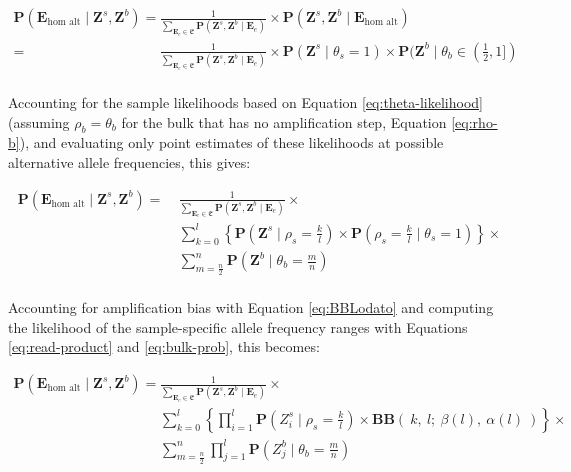 \documentclass[12pt,inline]{wlscirep}
\newcommand{\Prob}{{\mathbf{P}}}
\newcommand{\cB}{{\mathbf{B}}}
\begin{document}
\begin{equation}
 \label{eq:hom-alt-posterior-samples}
 \begin{split}
  \Prob(\boldsymbol{E}_{\text{hom alt}} \mid \boldsymbol{Z}^s,\boldsymbol{Z}^b)
    =~&\frac{1}{\sum_{\boldsymbol{E}_e \in \mathfrak{E}}{\Prob(\boldsymbol{Z}^s,\boldsymbol{Z}^b \mid \boldsymbol{E}_e )}} \times
      \Prob(\boldsymbol{Z}^s,\boldsymbol{Z}^b \mid \boldsymbol{E}_{\text{hom alt}}) \\
    =~&\frac{1}{\sum_{\boldsymbol{E}_e \in \mathfrak{E}}{\Prob(\boldsymbol{Z}^s,\boldsymbol{Z}^b \mid \boldsymbol{E}_e )}} \times
      \Prob(\boldsymbol{Z}^s \mid \theta_s = 1) \times \Prob(\boldsymbol{Z}^b \mid \theta_b \in (\frac12,1])\\
  \end{split}    
\end{equation}

Accounting for the sample likelihoods based on Equation \ref{eq:theta-likelihood} (assuming $\rho_b = \theta_b$ for the bulk that has no amplification step, Equation \ref{eq:rho-b}), and evaluating only point estimates of these likelihoods at possible alternative allele frequencies, this gives:

\begin{equation}
 \label{eq:hom-alt-posterior-likelihoods}
 \begin{split}   
 \Prob(\boldsymbol{E}_{\text{hom alt}} \mid \boldsymbol{Z}^s,\boldsymbol{Z}^b)
   =~&\frac{1}{\sum_{\boldsymbol{E}_e \in \mathfrak{E}}{\Prob(\boldsymbol{Z}^s,\boldsymbol{Z}^b \mid \boldsymbol{E}_e )}} \times \\
     &\sum_{k=0}^{l} \left\{ \Prob(\boldsymbol{Z}^s \mid \rho_s = \frac{k}{l}) \times \Prob(\rho_s = \frac{k}{l} \mid \theta_s =  1)\right\} \times \\
     &\sum_{m=\frac{n}{2}}^{n} \Prob(\boldsymbol{Z}^b \mid \theta_b = \frac{m}{n})\\
  \end{split}    
\end{equation}

Accounting for amplification bias with Equation \ref{eq:BBLodato} and computing the likelihood of the sample-specific allele frequency ranges with Equations \ref{eq:read-product} and \ref{eq:bulk-prob}, this becomes:

\begin{equation}
 \label{eq:hom-alt-posterior-reads}
 \begin{split}   
 \Prob(\boldsymbol{E}_{\text{hom alt}} \mid \boldsymbol{Z}^s,\boldsymbol{Z}^b)
   =~&\frac{1}{\sum_{\boldsymbol{E}_e \in \mathfrak{E}}{\Prob(\boldsymbol{Z}^s,\boldsymbol{Z}^b \mid \boldsymbol{E}_e )}} \times \\
      &\sum_{k=0}^{l} \left\{ \prod_{i=1}^l \Prob(Z_i^s \mid \rho_s = \frac{k}{l}) \times \cB\cB(~ k,~ l;~ \beta(l),~ \alpha(l)~ ) \right\} \times\\
      &\sum_{m=\frac{n}{2}}^{n} \prod_{j=1}^l \Prob\left(Z_j^b \mid \theta_b = \frac{m}{n} \right)\\
  \end{split}    
\end{equation}
\end{document}
